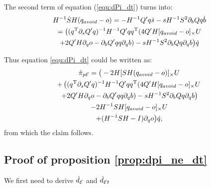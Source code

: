 \documentclass[10pt,twocolumn,twoside]{IEEEtran}
\begin{document}
    The second term of equation (\ref{equ:dPi_dt}) turns into:
    \begin{multline}
      H^{-1}\dot S H (q_{avoid} - o)
      = - H^{-1} Q' q \dot s - s H^{-1} S^2 \partial_b Q q \dot b\\
      =   \big( (q^\mathrm{T} \partial_s Q' q)^{-1} H^{-1} Q' q q^\mathrm{T}  (4Q' H[q_{avoid} - o]_\times U  \\
      + 2Q' H\partial_q o - \partial_b Q' q q \partial_q b) -  s H^{-1} S^2 \partial_b Q q \partial_q b\big) \dot q\\
    \end{multline}

    Thus equation \eqref{equ:dPi_dt} could be written as:
    \begin{multline}
      \dot \pi_{p\mathcal{E}} = \big(-2 H [ SH(q_{avoid}-o)]_{\times}U   \\
      + \left( (q^\mathrm{T} \partial_s Q' q)^{-1} H^{-1} Q' q q^\mathrm{T}  (4Q' H[q_{avoid} - o]_\times U \right. \\
      \left.+ 2Q' H\partial_q o - \partial_b Q' q q \partial_q b) -  s H^{-1} S^2 \partial_b Q q \partial_q b\right) \\
      -2H^{-1} S H[q_{avoid}-o]_{\times} U  \\
      + (H^{-1}SH -I)\partial_q o \big) \dot q,
    \end{multline}
    from which the claim follows.
  
  \subsection{Proof of proposition \ref{prop:dpi_ne_dt}}\label{proof:dpi_ne_dt}
    We first need to derive $\dot{d}_{\mathcal{E}}$ and $\dot{d}_{\mathcal{E} t}$
\end{document}

